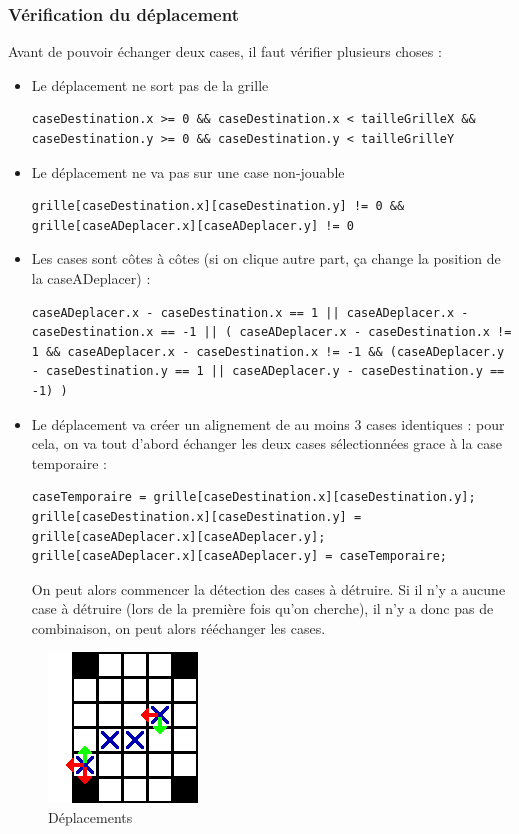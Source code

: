 \subsubsection{Vérification du déplacement}
Avant de pouvoir échanger deux cases, il faut vérifier plusieurs choses :
\begin{itemize}
	\item
		Le déplacement ne sort pas de la grille
\begin{lstlisting}
caseDestination.x >= 0 && caseDestination.x < tailleGrilleX && caseDestination.y >= 0 && caseDestination.y < tailleGrilleY
\end{lstlisting}
	\item
		Le déplacement ne va pas sur une case non-jouable
\begin{lstlisting}
grille[caseDestination.x][caseDestination.y] != 0 && grille[caseADeplacer.x][caseADeplacer.y] != 0
\end{lstlisting}
	\item
		Les cases sont côtes à côtes (si on clique autre part, ça change la position de la caseADeplacer) :
\begin{lstlisting}
caseADeplacer.x - caseDestination.x == 1 || caseADeplacer.x - caseDestination.x == -1 || ( caseADeplacer.x - caseDestination.x != 1 && caseADeplacer.x - caseDestination.x != -1 && (caseADeplacer.y - caseDestination.y == 1 || caseADeplacer.y - caseDestination.y == -1) )
\end{lstlisting}
	\item
		Le déplacement va créer un alignement de au moins 3 cases identiques : pour cela, on va tout d'abord échanger les deux cases sélectionnées grace à la case temporaire :
\begin{lstlisting}
caseTemporaire = grille[caseDestination.x][caseDestination.y];
grille[caseDestination.x][caseDestination.y] = grille[caseADeplacer.x][caseADeplacer.y];
grille[caseADeplacer.x][caseADeplacer.y] = caseTemporaire;
\end{lstlisting}
		On peut alors commencer la détection des cases à détruire. Si il n'y a aucune case à détruire (lors de la première fois qu'on cherche), il n'y a donc pas de combinaison, on peut alors rééchanger les cases.
\end{itemize}

\begin{figure}[position]
	\center
	\caption{\label{verifDepl} Déplacements}
	\includegraphics{imgs/verifDepl}
\end{figure}
		
